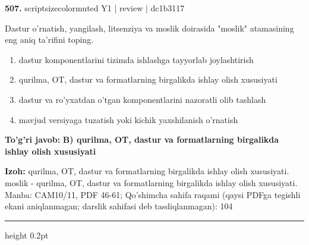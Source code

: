 \documentclass[10pt,a4paper]{article}
\begin{document}
{\bfseries\sffamily\color{ink} 507.} {scriptsizecolor{muted} Y1 | review | dc1b3117}
\par
Dastur o'rnatish, yangilash, litsenziya va moslik doirasida "moslik" atamasining eng aniq ta'rifini toping.
\begin{enumerate}[label=\Alph*),leftmargin=9mm]
\item dastur komponentlarini tizimda ishlashga tayyorlab joylashtirish
\item qurilma, OT, dastur va formatlarning birgalikda ishlay olish xususiyati
\item dastur va ro'yxatdan o'tgan komponentlarini nazoratli olib tashlash
\item mavjud versiyaga tuzatish yoki kichik yaxshilanish o'rnatish
\end{enumerate}
\begin{tcolorbox}[enhanced,breakable,colback=teal!4,colframe=teal!60!black,boxrule=0.45pt,arc=1.2mm,left=2.7mm,right=2.7mm,top=1.8mm,bottom=1.8mm,before skip=2mm,after skip=2mm]
{\bfseries\sffamily\color{teal}To'g'ri javob:} \textbf{B) qurilma, OT, dastur va formatlarning birgalikda ishlay olish xususiyati}
\par\smallskip
{\bfseries Izoh:} qurilma, OT, dastur va formatlarning birgalikda ishlay olish xususiyati. moslik - qurilma, OT, dastur va formatlarning birgalikda ishlay olish xususiyati. Manba: CAM10/11, PDF 46-61; Qo'shimcha sahifa raqami (qaysi PDFga tegishli ekani aniqlanmagan; darslik sahifasi deb tasdiqlanmagan): 104
\end{tcolorbox}
\vspace{2mm}\hrule height 0.2pt\vspace{3mm}
\end{document}
